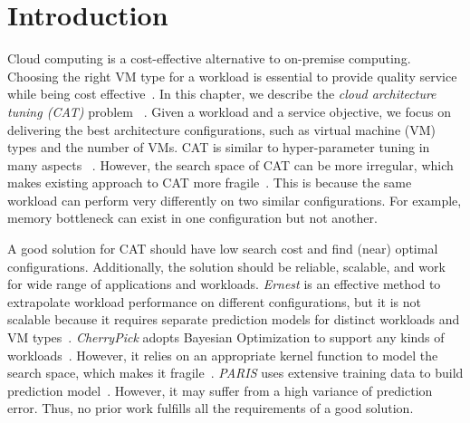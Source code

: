\section{Introduction}
\label{sec:cat::introduction}

\iffalse
Cloud computing is a cost-effective
alternative to on-premise computing.
Cloud computing (specifically, Infrastructure as a Service) provides a large variety of architectural configurations,
such as the number of cores, amount of memory, and the number of nodes.
Cloud service providers
(such as Amazon, Google, and Azure) offer over 100 virtual machines (VM) types~\cite{Yadwadkar2017}.
The ready flexibility in cloud offerings has created a paradigm shift.
Whereas before a workload was tuned for the cluster that was available, in the cloud
the \emph{architectural configuration can be tuned for the workload}.
This flexibility imposes a burden on users who must choose the \emph{right} architectural configurations.
The wrong choice can increase elapsed time by 20 times and 
cost 10 times compared to the optimal~\cite{Hsu2018Arrow,Hsu2018Scout}.
Users need an effective way to find the right architectural configurations
for their cloud applications.
Therefore,
choosing the right VM type for a workload is essential to provide quality service while being cost effective~\cite{Frey2013, Yao2017}.
\fi


Cloud computing is a cost-effective alternative to on-premise computing.
Choosing the right VM type for a workload is essential to provide quality service
while being cost effective~\cite{Frey2013, Yao2017}.
In this chapter, we describe the \emph{cloud architecture tuning (CAT)} problem
~\cite{Venkataraman2016,Alipourfard2017,Yadwadkar2017,Hsu2018Arrow}.
Given a workload and a service objective, we focus on delivering
the best architecture configurations, such as
virtual machine (VM) types and the number of VMs.
CAT is similar to hyper-parameter tuning in many aspects
~\cite{herodotou2011starfish,zhu2017bestconfig,Dewancker2015,shahriari2016taking,Klein2017,golovin2017google}.
However, the search space of CAT can be more irregular,
which makes existing approach to CAT more fragile~\cite{Hsu2018Arrow}.
This is because the same workload can perform very differently
on two similar configurations.
For example, memory bottleneck can exist in one configuration but not another.

A good solution for CAT should have 
low search cost and find (near) optimal configurations.
Additionally, the solution should be reliable, scalable, and work for wide range of applications and workloads.
\emph{Ernest} is an effective method to extrapolate workload performance
on different configurations, but it is not scalable because
it requires separate prediction models
for distinct workloads and VM types~\cite{Venkataraman2016}.
\emph{CherryPick} adopts Bayesian Optimization to support
any kinds of workloads~\cite{Alipourfard2017}.
However, it relies on an appropriate kernel function to model the search space,
which makes it fragile~\cite{Hsu2018Arrow}.
\emph{PARIS} uses extensive training data
to build prediction model~\cite{Yadwadkar2017}.
However, it may suffer from a high variance of prediction error.
Thus, no prior work fulfills all the requirements of a good solution.